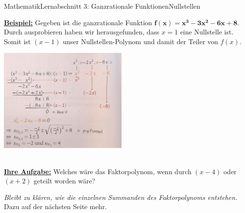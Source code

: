 \documentclass[11pt,twocolumn,oneside,openany,headings=optiontotoc,11pt,numbers=noenddot]{article}
\begin{document}
\begin{worksheet}{Mathematik}{Lernabschnitt 3: Ganzrationale Funktionen}{Nullstellen}
\begin{framed}
		\end{framed}
		\noindent
		\textbf{\underline{Beispiel:}} Gegeben ist die ganzrationale Funktion \(\mathbf{f(x) = x^3 - 3x^2 - 6x +8}\). Durch ausprobieren haben wir herausgefunden, dass \(x=1\) eine Nullstelle ist. Somit ist \((x-1)\) unser \grq{}Nullstellen-Polynom\grq{} und damit der Teiler von \(f(x)\).\\
		\par\noindent
		\includegraphics[width=0.48\textwidth]{../99_Bilder/polDiv.jpg}\\
		\tiny{}\normalsize\\
		\par\noindent
		\underline{\textbf{Ihre Aufgabe:}} Welches wäre das Faktorpolynom, wenn durch \((x-4)\) oder \((x+2)\) geteilt worden wäre?\\
		\par\noindent
		\textit{Bleibt zu klären, wie die einzelnen Summanden des Faktorpolynoms entstehen.} Dazu auf der nächsten Seite mehr.
		\onecolumn

\end{worksheet}
\end{document}
